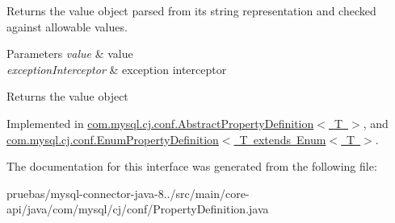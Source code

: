 Returns the value object parsed from it\textquotesingle{}s string representation and checked against allowable values.


\begin{DoxyParams}{Parameters}
{\em value} & value \\
\hline
{\em exception\+Interceptor} & exception interceptor\\
\hline
\end{DoxyParams}
\begin{DoxyReturn}{Returns}
the value object 
\end{DoxyReturn}


Implemented in \mbox{\hyperlink{classcom_1_1mysql_1_1cj_1_1conf_1_1_abstract_property_definition_aa8a990e4882d80051332cacda3886747}{com.\+mysql.\+cj.\+conf.\+Abstract\+Property\+Definition$<$ T $>$}}, and \mbox{\hyperlink{classcom_1_1mysql_1_1cj_1_1conf_1_1_enum_property_definition_a00a259a5d83a0a7c6522309ff44146ba}{com.\+mysql.\+cj.\+conf.\+Enum\+Property\+Definition$<$ T extends Enum$<$ T $>$}}.



The documentation for this interface was generated from the following file\+:\begin{DoxyCompactItemize}
\item 
pruebas/mysql-\/connector-\/java-\/8../src/main/core-\/api/java/com/mysql/cj/conf/Property\+Definition.\+java\end{DoxyCompactItemize}
